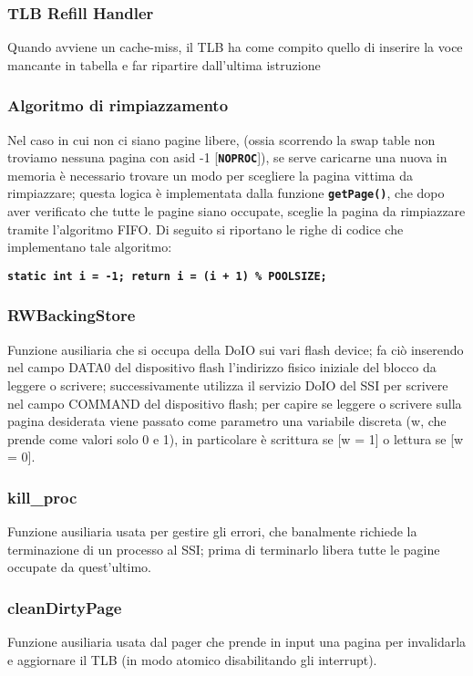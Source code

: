 \documentclass{article}
\begin{document}
\newpage
  
\subsubsection{TLB Refill Handler}
Quando avviene un cache-miss, il TLB ha come compito quello di inserire la voce mancante in tabella e far ripartire dall'ultima istruzione 

\subsubsection{Algoritmo di rimpiazzamento}
Nel caso in cui non ci siano pagine libere, (ossia scorrendo la swap table non troviamo nessuna pagina con asid -1 [\texttt{\textbf{NOPROC}}]), se serve caricarne una nuova in memoria è necessario trovare un modo per scegliere la pagina vittima da rimpiazzare; questa logica è implementata dalla funzione \texttt{\textbf{getPage()}}, che dopo aver verificato che tutte le pagine siano occupate, sceglie la pagina da rimpiazzare tramite l'algoritmo FIFO. Di seguito si riportano le righe di codice che implementano tale algoritmo:

\begin{center}
    \texttt{\textbf{static int i = -1;
    return i = (i + 1) \% POOLSIZE;}}
\end{center}

\subsubsection{RWBackingStore} 
Funzione ausiliaria che si occupa della DoIO sui vari flash device; fa ciò inserendo nel campo DATA0 del dispositivo flash l'indirizzo fisico iniziale del blocco da leggere o scrivere; successivamente utilizza il servizio DoIO del SSI per scrivere nel campo COMMAND del dispositivo flash; per capire se leggere o scrivere sulla pagina desiderata viene passato come parametro una variabile discreta (w, che prende come valori solo 0 e 1), in particolare è scrittura se [w = 1] o lettura se [w = 0].

\subsubsection{kill\_proc}
Funzione ausiliaria usata per gestire gli errori, che banalmente richiede la terminazione di un processo al SSI; prima di terminarlo libera tutte le pagine occupate da quest'ultimo.

\subsubsection{cleanDirtyPage}
Funzione ausiliaria usata dal pager che prende in input una pagina per invalidarla e aggiornare il TLB (in modo atomico disabilitando gli interrupt).
\end{document}
